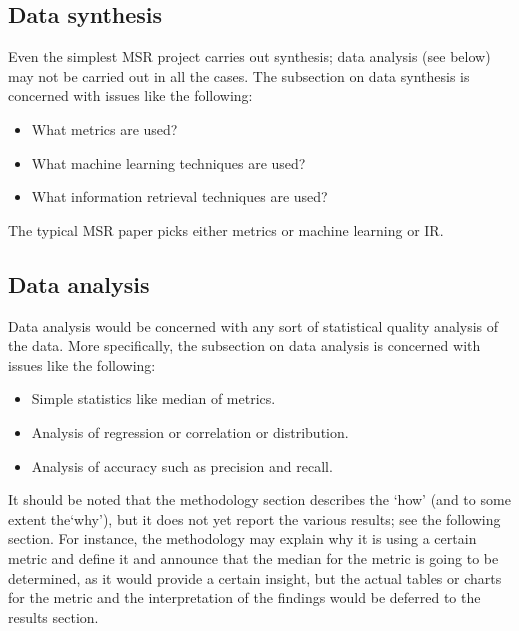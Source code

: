 \documentclass{llncs}
\begin{document}
\subsection{Data synthesis}

Even the simplest MSR project carries out synthesis; data analysis (see
below) may not be carried out in all the cases. The subsection on data
synthesis is concerned with issues like the following:

\begin{itemize}

\item What metrics are used?

\item What machine learning techniques are used?

\item What information retrieval techniques are used?

\end{itemize}

The typical MSR paper picks either metrics or machine learning or IR.

\subsection{Data analysis}

Data analysis would be concerned with any sort of statistical quality
analysis of the data. More specifically, the subsection on data
analysis is concerned with issues like the following:

\begin{itemize}

\item Simple statistics like median of metrics.

\item Analysis of regression or correlation or distribution.

\item Analysis of accuracy such as precision and recall.

\end{itemize}

It should be noted that the methodology section describes the `how'
(and to some extent the`why'), but it does not yet report the various
results; see the following section. For instance, the methodology may
explain why it is using a certain metric and define it and announce
that the median for the metric is going to be determined, as it would
provide a certain insight, but the actual tables or charts for the
metric and the interpretation of the findings would be deferred to the
results section.
\end{document}
